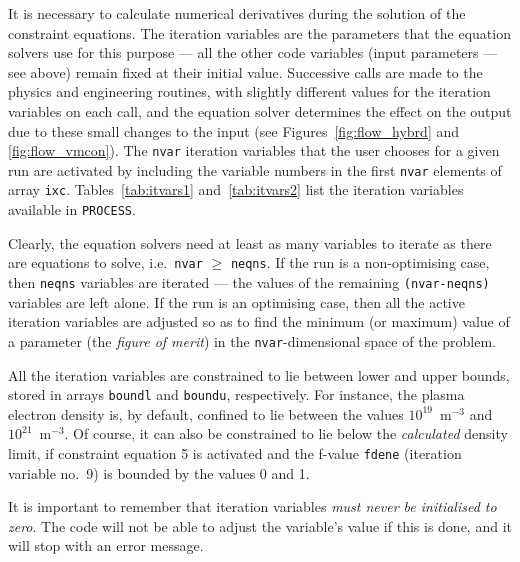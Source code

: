 \documentclass[11pt,a4paper]{report}
\newcommand{\process}{\mbox{\texttt{PROCESS}}}
\begin{document}
It is necessary to calculate numerical derivatives during the solution of the
constraint equations. The iteration variables are the parameters that the
equation solvers use for this purpose --- all the other code variables (input
parameters --- see above) remain fixed at their initial value. Successive
calls are made to the physics and engineering routines, with slightly
different values for the iteration variables on each call, and the equation
solver determines the effect on the output due to these small changes to the
input (see Figures~\ref{fig:flow_hybrd} and \ref{fig:flow_vmcon}). The
\texttt{nvar} iteration variables that the user chooses for a given run are
activated by including the variable numbers in the first \texttt{nvar}
elements of array \texttt{ixc}. Tables~\ref{tab:itvars1} and~\ref{tab:itvars2}
list the iteration variables available in \process.

Clearly, the equation solvers need at least as many variables to iterate as
there are equations to solve, i.e.\ \texttt{nvar} $\geq$ \texttt{neqns}. If
the run is a non-optimising case, then \texttt{neqns} variables are iterated
--- the values of the remaining \texttt{(nvar-neqns)} variables are left
alone. If the run is an optimising case, then all the active iteration
variables are adjusted so as to find the minimum (or maximum) value of a
parameter (the \textit{ figure of merit}) in the \texttt{nvar}-dimensional
space of the problem.

All the iteration variables are constrained to lie between lower and upper
bounds, stored in arrays \texttt{boundl} and \texttt{boundu},
respectively. For instance, the plasma electron density is, by default,
confined to lie between the values $10^{19}$~m$^{-3}$ and
$10^{21}$~m$^{-3}$. Of course, it can also be constrained to lie below the
\textit{calculated}\/ density limit, if constraint equation 5 is activated and
the f-value \texttt{fdene} (iteration variable no.\ 9) is bounded by the
values 0 and 1.

It is important to remember that iteration variables \textit{must never be
initialised to zero}. The code will not be able to adjust the variable's value
if this is done, and it will stop with an error message.

\end{document}
